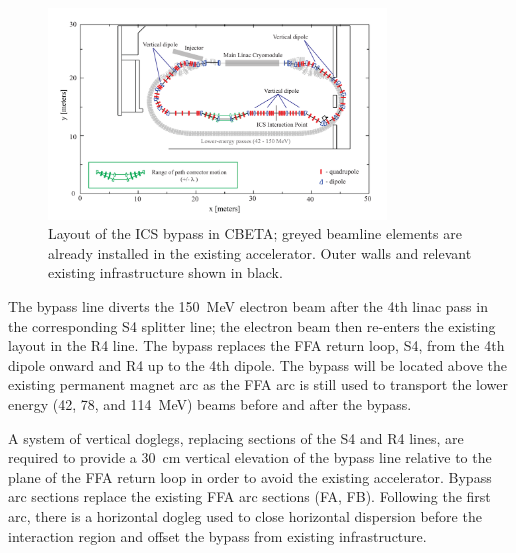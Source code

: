 \documentclass[../main.tex]{subfiles}
\begin{document}
\begin{figure}[!h]
\centering
\includegraphics[width=0.8\textwidth]{Figures/CBETA_Inverse_Compton_Source_Design/cbetaicslayout.pdf}
\caption{Layout of the ICS bypass in CBETA; greyed beamline elements are already installed in the existing accelerator. Outer walls and relevant existing infrastructure shown in black.}
\label{fig:CBETA_ICS_Layout}
\end{figure}

The bypass line diverts the 150~\si{\mega\electronvolt} electron beam after the 4th linac pass in the corresponding S4 splitter line; the electron beam then re-enters the existing layout in the R4 line. The bypass replaces the FFA return loop, S4, from the 4th dipole onward and R4 up to the 4th dipole. The bypass will be located above the existing permanent magnet arc as the FFA arc is still used to transport the lower energy (42, 78, and 114~MeV) beams before and after the bypass.

A system of vertical doglegs, replacing sections of the S4 and R4 lines, are required to provide a 30~\si{\centi\meter} vertical elevation of the bypass line relative to the plane of the FFA return loop in order to avoid the existing accelerator. Bypass arc sections replace the existing FFA arc sections (FA, FB). Following the first arc, there is a horizontal dogleg used to close horizontal dispersion before the interaction region and offset the bypass from existing infrastructure. 
\end{document}
